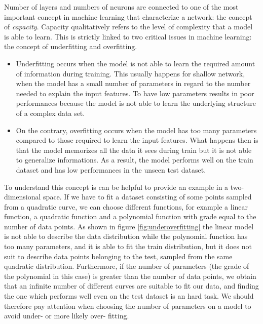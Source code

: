 \documentclass[11pt]{report}
\begin{document}
Number of layers and numbers of neurons are connected to one of the most important concept in machine learning that characterize a network: the concept of \emph{capacity}.
Capacity qualitatively refers to the level of complexity that a model is able to learn.
This is strictly linked to two critical issues in machine learning: the concept of underfitting and overfitting.
\begin{itemize}
\item Underfitting occurs when the model is not able to learn the required amount of information during training.
This usually happens for shallow network, when the model has a small number of parameters in regard to the number needed to explain the input features.
To have low parameters results in poor performances because the model is not able to learn the underlying structure of a complex data set.

\item On the contrary, overfitting occurs when the model has too many parameters compared to those required to learn the input features.
What happens then is that the model memorizes all the data it sees during train but it is not able to generalize informations.
As a result, the model performs well on the train dataset and has low performances in the unseen test dataset.
\end{itemize}

To understand this concept is can be helpful to provide an example in a two-dimensional space.
If we have to fit a dataset consisting of some points sampled from a quadratic curve, we can choose different functions, for example a linear function, a quadratic function and a polynomial function with grade equal to the number of data points.
As shown in figure \ref{fig:underoverfitting} the linear model is not able to describe the data distribution while the polynomial function has too many parameters, and it is able to fit the train distribution, but it does not suit to describe data points belonging to the test, sampled from the same quadratic distribution.
Furthermore, if the number of parameters (the grade of the polynomial in this case) is greater than the number of data points, we obtain that an infinite number of different curves are suitable to fit our data, and finding the one which performs well even on the test dataset is an hard task.
We should therefore pay attention when choosing the number of parameters on a model to avoid under- or more likely over- fitting.
\end{document}
